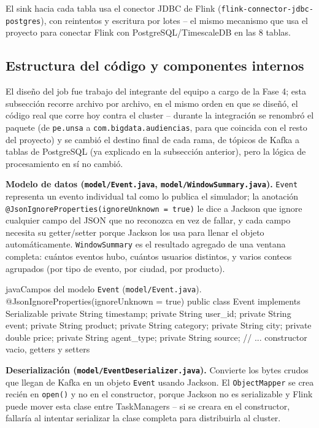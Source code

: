 El sink hacia cada tabla usa el conector JDBC de Flink (\texttt{flink-connector-jdbc-postgres}), con reintentos y escritura por lotes -- el mismo mecanismo que usa el proyecto para conectar Flink con PostgreSQL/TimescaleDB en las 8 tablas.

\subsection{Estructura del código y componentes internos}

El diseño del job fue trabajo del integrante del equipo a cargo de la Fase 4; esta subsección recorre archivo por archivo, en el mismo orden en que se diseñó, el código real que corre hoy contra el cluster -- durante la integración se renombró el paquete (de \texttt{pe.unsa} a \texttt{com.bigdata.audiencias}, para que coincida con el resto del proyecto) y se cambió el destino final de cada rama, de tópicos de Kafka a tablas de PostgreSQL (ya explicado en la subsección anterior), pero la lógica de procesamiento en sí no cambió.

\textbf{Modelo de datos (\texttt{model/Event.java}, \texttt{model/WindowSummary.java}).} \texttt{Event} representa un evento individual tal como lo publica el simulador; la anotación \texttt{@JsonIgnoreProperties(ignoreUnknown = true)} le dice a Jackson que ignore cualquier campo del JSON que no reconozca en vez de fallar, y cada campo necesita su getter/setter porque Jackson los usa para llenar el objeto automáticamente. \texttt{WindowSummary} es el resultado agregado de una ventana completa: cuántos eventos hubo, cuántos usuarios distintos, y varios conteos agrupados (por tipo de evento, por ciudad, por producto).

\begin{sourcecode}[\label{code:event}]{java}{Campos del modelo \texttt{Event} (\texttt{model/Event.java}).}
@JsonIgnoreProperties(ignoreUnknown = true)
public class Event implements Serializable {
    private String timestamp;
    private String user_id;
    private String event;
    private String product;
    private String category;
    private String city;
    private double price;
    private String agent_type;
    private String source;
    // ... constructor vacio, getters y setters
}
\end{sourcecode}

\textbf{Deserialización (\texttt{model/EventDeserializer.java}).} Convierte los bytes crudos que llegan de Kafka en un objeto \texttt{Event} usando Jackson. El \texttt{ObjectMapper} se crea recién en \texttt{open()} y no en el constructor, porque Jackson no es serializable y Flink puede mover esta clase entre TaskManagers -- si se creara en el constructor, fallaría al intentar serializar la clase completa para distribuirla al cluster.

